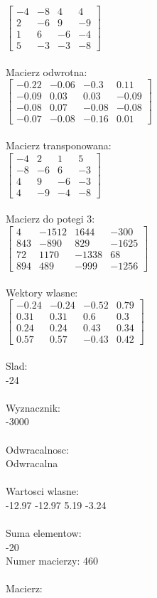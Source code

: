 \documentclass[a4paper,12pt]{article}
\begin{document}
$\begin{bmatrix} -4&-8&4&4\\2&-6&9&-9\\1&6&-6&-4\\5&-3&-3&-8 \end{bmatrix}$
\\
\\
Macierz odwrotna:\\

$\begin{bmatrix} -0.22&-0.06&-0.3&0.11\\-0.09&0.03&0.03&-0.09\\-0.08&0.07&-0.08&-0.08\\-0.07&-0.08&-0.16&0.01 \end{bmatrix}$
\\
\\
Macierz transponowana:\\

$\begin{bmatrix} -4&2&1&5\\-8&-6&6&-3\\4&9&-6&-3\\4&-9&-4&-8 \end{bmatrix}$
\\
\\
Macierz do potegi 3:\\

$\begin{bmatrix} 4&-1512&1644&-300\\843&-890&829&-1625\\72&1170&-1338&68\\894&489&-999&-1256 \end{bmatrix}$
\\
\\
Wektory wlasne:\\

$\begin{bmatrix} -0.24&-0.24&-0.52&0.79\\0.31&0.31&0.6&0.3\\0.24&0.24&0.43&0.34\\0.57&0.57&-0.43&0.42 \end{bmatrix}$
\\
\\
Slad:\\
-24
\\
\\
Wyznacznik:\\
-3000
\\
\\
Odwracalnosc:\\
Odwracalna
\\
\\
Wartosci wlasne:\\
-12.97 -12.97 5.19 -3.24
\\
\\
Suma elementow:\\
-20
\\
\newpage
Numer macierzy:
460
\\
\\
Macierz:\\
\end{document}

